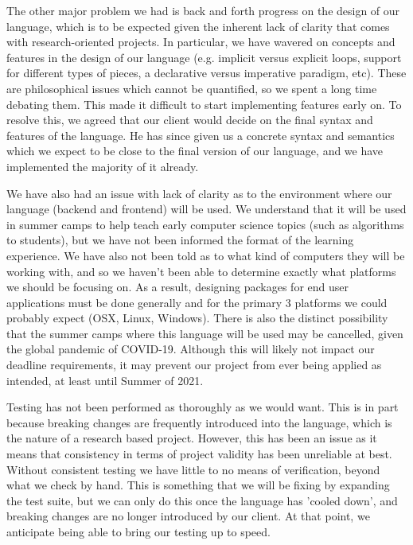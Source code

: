 \documentclass[onecolumn, draftclsnofoot,10pt, compsoc]{IEEEtran}
\begin{document}
\begin{singlespace}
    The other major problem we had is back and forth progress on the design of our language, which is to be expected given the inherent lack of clarity that comes with research-oriented projects. In particular, we have wavered on concepts and features in the design of our language (e.g. implicit versus explicit loops, support for different types of pieces, a declarative versus imperative paradigm, etc). These are philosophical issues which cannot be quantified, so we spent a long time debating them. This made it difficult to start implementing features early on. To resolve this, we agreed that our client would decide on the final syntax and features of the language. He has since given us a concrete syntax and semantics which we expect to be close to the final version of our language, and we have implemented the majority of it already. 

    We have also had an issue with lack of clarity as to the environment where our language (backend and frontend) will be used. We understand that it will be used in summer camps to help teach early computer science topics (such as algorithms to students), but we have not been informed the format of the learning experience. We have also not been told as to what kind of computers they will be working with, and so we haven't been able to determine exactly what platforms we should be focusing on. As a result, designing packages for end user applications must be done generally and for the primary 3 platforms we could probably expect (OSX, Linux, Windows). There is also the distinct possibility that the summer camps where this language will be used may be cancelled, given the global pandemic of COVID-19. Although this will likely not impact our deadline requirements, it may prevent our project from ever being applied as intended, at least until Summer of 2021.
    
    Testing has not been performed as thoroughly as we would want. This is in part because breaking changes are frequently introduced into the language, which is the nature of a research based project. However, this has been an issue as it means that consistency in terms of project validity has been unreliable at best. Without consistent testing we have little to no means of verification, beyond what we check by hand. This is something that we will be fixing by expanding the test suite, but we can only do this once the language has 'cooled down', and breaking changes are no longer introduced by our client. At that point, we anticipate being able to bring our testing up to speed.
    

\end{singlespace}
\end{document}
